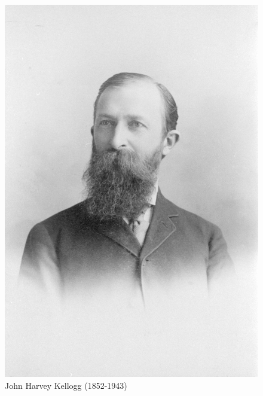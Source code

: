 \begin{figure}[hp]
    \centering
    \includegraphics[width=1\linewidth]{images/john-h-kellogg.jpg}
    \caption*{John Harvey Kellogg (1852-1943)}
    \label{fig:john-h-kellogg}
\end{figure}


